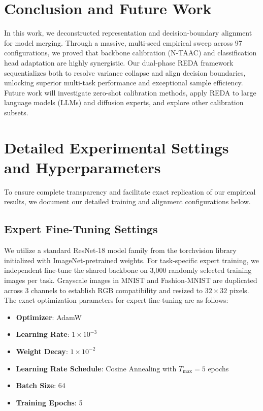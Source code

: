\documentclass{article}
\theoremstyle{plain}
\theoremstyle{definition}
\theoremstyle{remark}
\begin{document}
\section{Conclusion and Future Work}
\label{sec:conclusion}
In this work, we deconstructed representation and decision-boundary alignment for model merging. Through a massive, multi-seed empirical sweep across 97 configurations, we proved that backbone calibration (N-TAAC) and classification head adaptation are highly synergistic. Our dual-phase REDA framework sequentializes both to resolve variance collapse and align decision boundaries, unlocking superior multi-task performance and exceptional sample efficiency. Future work will investigate zero-shot calibration methods, apply REDA to large language models (LLMs) and diffusion experts, and explore other calibration subsets.

\clearpage




\clearpage
\appendix
\onecolumn

\section{Detailed Experimental Settings and Hyperparameters}
\label{app:hparams}

To ensure complete transparency and facilitate exact replication of our empirical results, we document our detailed training and alignment configurations below.

\subsection{Expert Fine-Tuning Settings}
We utilize a standard ResNet-18 model family from the torchvision library initialized with ImageNet-pretrained weights. For task-specific expert training, we independent fine-tune the shared backbone on 3,000 randomly selected training images per task. Grayscale images in MNIST and Fashion-MNIST are duplicated across 3 channels to establish RGB compatibility and resized to $32 \times 32$ pixels.
The exact optimization parameters for expert fine-tuning are as follows:
\begin{itemize}
    \item \textbf{Optimizer}: AdamW \cite{loshchilov2017decoupled}
    \item \textbf{Learning Rate}: $1 \times 10^{-3}$
    \item \textbf{Weight Decay}: $1 \times 10^{-2}$
    \item \textbf{Learning Rate Schedule}: Cosine Annealing with $T_{\text{max}} = 5$ epochs
    \item \textbf{Batch Size}: 64
    \item \textbf{Training Epochs}: 5
\end{itemize}
\end{document}
